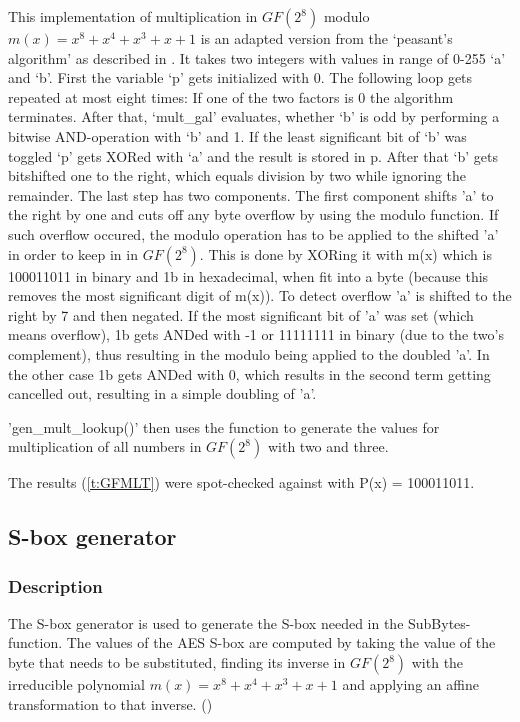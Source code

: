 This implementation of multiplication in $GF(2^{8})$ modulo $m(x) = x^8 + x^4 +
x^3 + x + 1$ is an adapted version from the `peasant's algorithm' as
described in
\cite{peasants}.
It takes two integers with values in range of 0-255 `a' and `b'. First
the variable `p' gets initialized with 0. The following loop gets
repeated at most eight times: If one of the two factors is 0 the
algorithm terminates. After that, `mult\_gal' evaluates, whether `b' is
odd by performing a bitwise AND-operation with `b' and 1. If the least
significant bit of `b' was toggled `p' gets XORed with `a' and the
result is stored in p. After that `b' gets bitshifted one to the right,
which equals division by two while ignoring the remainder. The last step
has two components.
The first component shifts 'a' to the right by one and cuts off any byte overflow
by using the modulo function. If such overflow occured, the modulo operation has to be
applied to the shifted 'a' in order to keep in in $GF(2^{8})$. This is done by XORing it 
with m(x) which is 100011011 in binary and 1b in hexadecimal, when fit into a byte (because
this removes the most significant digit of m(x)). To detect overflow 'a' is shifted to the right by 7
and then negated. If the most significant bit of 'a' was set (which means overflow), 1b gets ANDed
with -1 or 11111111 in binary (due to the two's complement), thus resulting in the modulo being applied to the doubled 'a'. In the other case 1b gets ANDed with 0, which results in the second term getting cancelled out, resulting in a simple doubling of 'a'.

'gen\_mult\_lookup()' then uses the function to generate the values for
multiplication of all numbers in $GF(2^{8})$ with two and three.

The results (\ref{t:GFMLT}) were spot-checked against
\cite{galcalc} with P(x) = 100011011.

\hypertarget{s-box-generator}{%
\subsection{S-box generator}\label{s-box-generator}}

\hypertarget{description-1}{%
\subsubsection{Description}\label{description-1}}

The S-box generator is used to generate the S-box needed in the
SubBytes-function.
The values of the AES S-box are computed by taking the value of the byte
that needs to be substituted, finding its inverse in $GF(2^{8})$ with the
irreducible polynomial $m(x) = x^8 + x^4 + x^3 + x + 1$ and applying an
affine transformation to that inverse. (\cite[ch 3.4.1]{rijndael})

